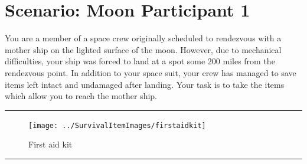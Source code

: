 \documentclass{article}
\begin{document}
    \section*{Scenario: \textmd{Moon} \hfill Participant \textmd{1}}
    \Large You are a member of a space crew originally scheduled to rendezvous with a mother ship on the lighted surface of the moon. However, due to mechanical difficulties, your ship was forced to land at a spot some 200 miles from the rendezvous point. In addition to your space suit, your crew has managed to save items left intact and undamaged after landing. Your task is to take the items which allow you to reach the mother ship.
\clearpage
        \par\noindent\rule{\textwidth}{0.4pt}
    \begin{figure}[H]
        \centering
        \begin{minipage}{0.25\textwidth}
            \centering
            \texttt{[image: ../SurvivalItemImages/firstaidkit]}
        \end{minipage}\hfill
        \begin{minipage}{0.7\textwidth}
            \centering
            \Large First aid kit
        \end{minipage}
    \end{figure}
    \vspace{-0.8em}
    \noindent\rule{\textwidth}{0.4pt}
            
\end{document}
